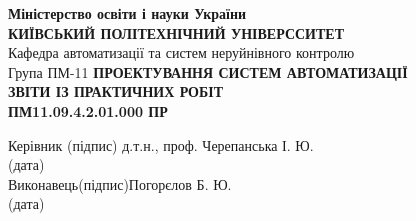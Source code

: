\documentclass[a4paper]{article}
\begin{document}
\thispagestyle{empty}
\centering
\textbf{Міністерство освіти і науки України}\\
\textbf{КИЇВСЬКИЙ ПОЛІТЕХНІЧНИЙ УНІВЕРССИТЕТ}\\[2cm]
\raggedleft
Кафедра автоматизації та систем неруйнівного контролю\\
Група ПМ-11
\vfill
\centering
\textbf{ПРОЕКТУВАННЯ СИСТЕМ АВТОМАТИЗАЦІЇ}\\[1cm]
\textbf{ЗВІТИ ІЗ ПРАКТИЧНИХ РОБІТ}\\[1cm]
\textbf{ПМ11.09.4.2.01.000 ПР}
\vfill
\begin{flushleft}
    Керівник  \qquad\qquad\quad \hfill\qquad (підпис)\hfill 
    д.т.н., проф. Черепанська І. Ю.\\
    \hfill (дата)\\[2cm]
    Виконавець\hfill (підпис)\hfill Погорєлов Б. Ю.\\
    \hfill (дата)
\end{flushleft}
\vfill
{}
\newpage


\thispagestyle{empty} %
    
    
\end{document}

